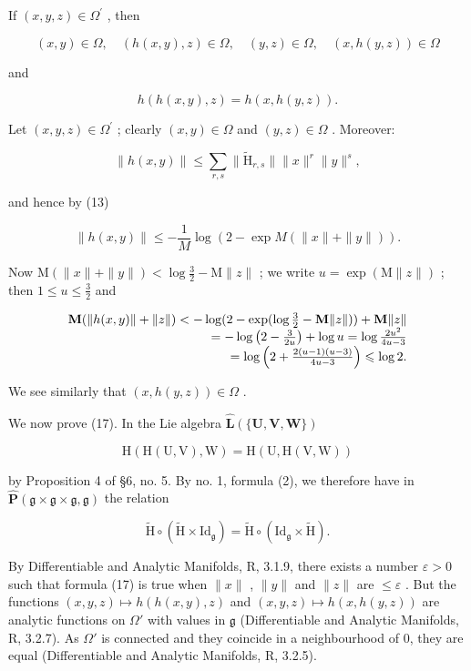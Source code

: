 If \((x,y,z)\in \Omega^{\prime}\) , then

\[
(x, y) \in \Omega , \quad (h (x, y), z) \in \Omega , \quad (y, z) \in \Omega , \quad (x, h (y, z)) \in \Omega\tag{16}
\]

and

\[
h (h (x, y), z) = h (x, h (y, z)).\tag{17}
\]

Let \((x,y,z)\in \Omega^{\prime}\) ; clearly \((x,y)\in \Omega\) and \((y,z)\in \Omega\) . Moreover:

\[
\| h (x, y) \| \leqslant \sum_ {r, s} \| \tilde {\mathrm{H}} _ {r, s} \| \| x \| ^ {r} \| y \| ^ {s},
\]

and hence by (13)

\[
\| h (x, y) \| \leqslant - \frac {1}{M} \log (2 - \exp M (\| x \| + \| y \|)).
\]

Now \(\mathrm{M}(\|x\| + \|y\|) < \log \frac{3}{2} - \mathrm{M}\|z\|\) ; we write \(u = \exp(\mathrm{M}\|z\|)\) ; then \(1 \leqslant u \leqslant \frac{3}{2}\) and

\[
\begin{array}{r l} \mathbf {M} (\| h (x, y) \| + \| z \|) <   - \log (2 - \exp (\log \frac {3}{2} - \mathbf {M} \| z \|)) + \mathbf {M} \| z \| \\ = - \log \left(2 - \frac {3}{2 u}\right) + \log u = \log \frac {2 u ^ {2}}{4 u - 3} \\ = \log \left(2 + \frac {2 (u - 1) (u - 3)}{4 u - 3}\right) \leqslant \log 2. \end{array}
\]

We see similarly that \((x, h(y, z)) \in \Omega\) .

We now prove (17). In the Lie algebra \(\hat{\mathbf{L}}(\{\mathbf{U},\mathbf{V},\mathbf{W}\})\)

\[
\mathrm{H} (\mathrm{H} (\mathrm{U}, \mathrm{V}), \mathrm{W}) = \mathrm{H} (\mathrm{U}, \mathrm{H} (\mathrm{V}, \mathrm{W}))
\]

by Proposition 4 of §6, no. 5. By no. 1, formula (2), we therefore have in \(\hat{\mathbf{P}}(\mathfrak{g} \times \mathfrak{g} \times \mathfrak{g}, \mathfrak{g})\) the relation

\[
\tilde {\mathrm{H}} \circ (\tilde {\mathrm{H}} \times \mathrm{Id} _ {\mathfrak {g}}) = \tilde {\mathrm{H}} \circ (\mathrm{Id} _ {\mathfrak {g}} \times \tilde {\mathrm{H}}).
\]

By Differentiable and Analytic Manifolds, R, 3.1.9, there exists a number \(\varepsilon > 0\) such that formula (17) is true when \(\|x\|\) , \(\|y\|\) and \(\|z\|\) are \(\leqslant \varepsilon\) . But the functions \((x,y,z)\mapsto h(h(x,y),z)\) and \((x,y,z)\mapsto h(x,h(y,z))\) are analytic functions on \(\Omega'\) with values in \(\mathfrak{g}\) (Differentiable and Analytic Manifolds, R, 3.2.7). As \(\Omega'\) is connected and they coincide in a neighbourhood of 0, they are equal (Differentiable and Analytic Manifolds, R, 3.2.5).

